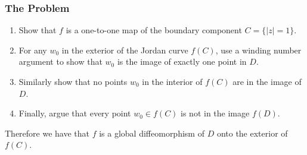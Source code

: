 \subsubsection*{The Problem}
\begin{enumerate}
\item Show that \(f\) is a one-to-one map of the boundary component \(C = \{|z| = 1\}\).
\item For any \(w_0\) in the exterior of the Jordan curve \(f(C)\), use a winding number argument to 
show that \(w_0\) is the image of exactly one point in \(D\). 
\item Similarly show that no points \(w_0\) in the interior of \(f(C)\) are in the image of \(D\).  
\item Finally, argue that every point \(w_0 \in f(C)\) is not in the image \(f(D)\).
\end{enumerate}
Therefore we have that \(f\) is a global diffeomorphism of \(D\) onto the exterior of \(f(C)\). 

